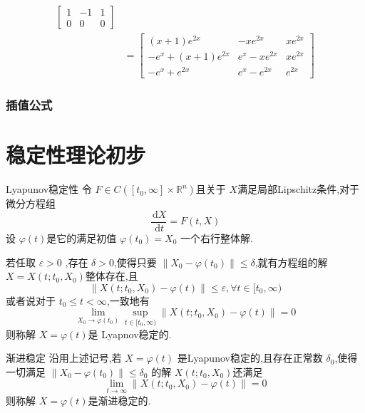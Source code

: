 \documentclass[lang=cn,12pt,color=green,fontset=none]{elegantbook}
\begin{document}
\begin{solution}
\[\begin{aligned}
\begin{bmatrix}
                1&-1&1\\ 
                 0&0&0 
           \end{bmatrix}\\ 
            & = \begin{bmatrix} 
                \left( x+ 1 \right)e^{2x}&-xe^{2x}&xe^{2x}\\ 
                 -e^{x}+ \left( x+ 1 \right)e^{2x}   &e^{x}-xe^{2x}& xe^{2x}\\ 
                 - e^{x}+ e^{2x}&e^{x}-e^{2x}& e^{2x}
            \end{bmatrix}    
    \end{aligned}  
    \]
\end{solution}

\subsection{插值公式}

\chapter{稳定性理论初步}

\begin{definition}{Lyapunov稳定性}
    令 $ F \in C\left( [t_0,\infty]\times \mathbb{R} ^{n} \right)  $且关于 $ X $满足局部Lipschitz条件,对于微分方程组
    \begin{equation}\label{eq:gen-eq}
        \frac{\,\mathrm{d} X }{\,\mathrm{d} t }= F\left( t,X \right)  
    \end{equation}  
    设 $ \varphi \left( t \right)  $是它的满足初值 $ \varphi \left( t_0 \right)=X_0  $ 一个右行整体解.
    
    若任取 $  \varepsilon >0 $ ,存在 $  \delta >0 $,使得只要 $  \left\| X_0-\varphi \left( t_0 \right)  \right\| \le  \delta $,就有方程组的解 $ X=X\left( t;t_0,X_0 \right)  $整体存在,且 $$
    \left\| X\left( t;t_0,X_0 \right)-\varphi \left( t \right)   \right\|\le  \varepsilon , \forall t\in [t_0,\infty)
    $$   或者说对于 $ t_0\le t<\infty $,一致地有 $$
    \lim_{X_0 \to \varphi \left( t_0 \right) } \sup _{t\in [t_0,\infty  )} \left\| X\left( t;t_0,X_0 \right)-\varphi \left( t \right)   \right\|=0
    $$ 则称解 $ X=\varphi \left( t \right)  $是 Lyapnov稳定的. 
\end{definition}

\begin{definition}{渐进稳定}
    沿用上述记号,若 $ X=\varphi \left( t \right)  $ 是Lyapunov稳定的,且存在正常数 $  \delta _{0} $,使得一切满足 $ \left\| X_0-\varphi \left( t_0 \right)  \right\|\le  \delta _{0} $  的解 $ X\left( t;t_0,X_0 \right)  $还满足 $$
    \lim_{t \to \infty}\left\| X\left( t;t_0,X_0 \right)-\varphi \left( t \right)   \right\|=0
    $$则称解 $ X=\varphi \left( t \right)  $是渐进稳定的.  
\end{definition}
\end{document}
